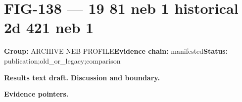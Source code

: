 \clearpage
\section{FIG-138 --- 19 81 neb 1 historical 2d 421 neb 1}
\label{figpage:fig-138}
\textbf{Group:} ARCHIVE-NEB-PROFILE\quad \textbf{Evidence chain:} manifested\quad \textbf{Status:} publication;old\_or\_legacy;comparison

\textbf{Results text draft.} 
\textbf{Discussion and boundary.} 


\textbf{Evidence pointers.}



\vfill
